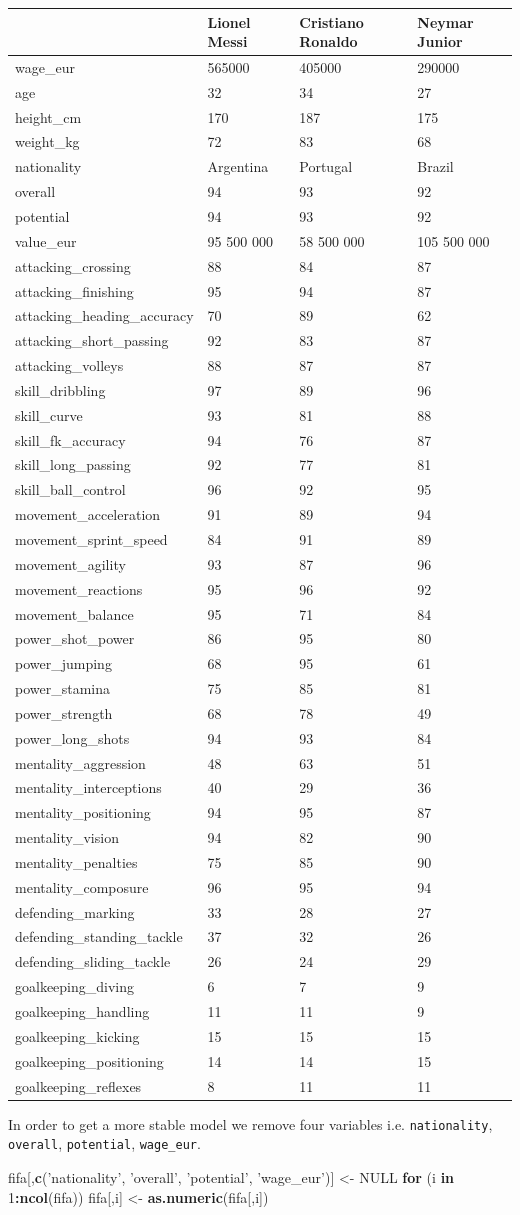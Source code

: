 \documentclass[]{scrbook}
\newenvironment{Shaded}{\begin{snugshade}}{\end{snugshade}}
\newcommand{\ControlFlowTok}[1]{\textcolor[rgb]{0.13,0.29,0.53}{\textbf{#1}}}
\newcommand{\DecValTok}[1]{\textcolor[rgb]{0.00,0.00,0.81}{#1}}
\newcommand{\KeywordTok}[1]{\textcolor[rgb]{0.13,0.29,0.53}{\textbf{#1}}}
\newcommand{\NormalTok}[1]{#1}
\newcommand{\OperatorTok}[1]{\textcolor[rgb]{0.81,0.36,0.00}{\textbf{#1}}}
\newcommand{\OtherTok}[1]{\textcolor[rgb]{0.56,0.35,0.01}{#1}}
\newcommand{\StringTok}[1]{\textcolor[rgb]{0.31,0.60,0.02}{#1}}
\renewenvironment{Shaded} {\begin{snugshade}\small} {\end{snugshade}}
\begin{document}
\begin{longtable}[]{@{}llll@{}}
\toprule
& Lionel Messi & Cristiano Ronaldo & Neymar Junior\tabularnewline
\midrule
\endhead
wage\_eur & 565000 & 405000 & 290000\tabularnewline
age & 32 & 34 & 27\tabularnewline
height\_cm & 170 & 187 & 175\tabularnewline
weight\_kg & 72 & 83 & 68\tabularnewline
nationality & Argentina & Portugal & Brazil\tabularnewline
overall & 94 & 93 & 92\tabularnewline
potential & 94 & 93 & 92\tabularnewline
value\_eur & 95 500 000 & 58 500 000 & 105 500 000\tabularnewline
attacking\_crossing & 88 & 84 & 87\tabularnewline
attacking\_finishing & 95 & 94 & 87\tabularnewline
attacking\_heading\_accuracy & 70 & 89 & 62\tabularnewline
attacking\_short\_passing & 92 & 83 & 87\tabularnewline
attacking\_volleys & 88 & 87 & 87\tabularnewline
skill\_dribbling & 97 & 89 & 96\tabularnewline
skill\_curve & 93 & 81 & 88\tabularnewline
skill\_fk\_accuracy & 94 & 76 & 87\tabularnewline
skill\_long\_passing & 92 & 77 & 81\tabularnewline
skill\_ball\_control & 96 & 92 & 95\tabularnewline
movement\_acceleration & 91 & 89 & 94\tabularnewline
movement\_sprint\_speed & 84 & 91 & 89\tabularnewline
movement\_agility & 93 & 87 & 96\tabularnewline
movement\_reactions & 95 & 96 & 92\tabularnewline
movement\_balance & 95 & 71 & 84\tabularnewline
power\_shot\_power & 86 & 95 & 80\tabularnewline
power\_jumping & 68 & 95 & 61\tabularnewline
power\_stamina & 75 & 85 & 81\tabularnewline
power\_strength & 68 & 78 & 49\tabularnewline
power\_long\_shots & 94 & 93 & 84\tabularnewline
mentality\_aggression & 48 & 63 & 51\tabularnewline
mentality\_interceptions & 40 & 29 & 36\tabularnewline
mentality\_positioning & 94 & 95 & 87\tabularnewline
mentality\_vision & 94 & 82 & 90\tabularnewline
mentality\_penalties & 75 & 85 & 90\tabularnewline
mentality\_composure & 96 & 95 & 94\tabularnewline
defending\_marking & 33 & 28 & 27\tabularnewline
defending\_standing\_tackle & 37 & 32 & 26\tabularnewline
defending\_sliding\_tackle & 26 & 24 & 29\tabularnewline
goalkeeping\_diving & 6 & 7 & 9\tabularnewline
goalkeeping\_handling & 11 & 11 & 9\tabularnewline
goalkeeping\_kicking & 15 & 15 & 15\tabularnewline
goalkeeping\_positioning & 14 & 14 & 15\tabularnewline
goalkeeping\_reflexes & 8 & 11 & 11\tabularnewline
\bottomrule
\end{longtable}

In order to get a more stable model we remove four variables i.e. \texttt{nationality}, \texttt{overall}, \texttt{potential}, \texttt{wage\_eur}.

\begin{Shaded}
\begin{Highlighting}[]
\NormalTok{fifa[,}\KeywordTok{c}\NormalTok{(}\StringTok{'nationality'}\NormalTok{, }\StringTok{'overall'}\NormalTok{, }\StringTok{'potential'}\NormalTok{, }\StringTok{'wage_eur'}\NormalTok{)] <-}\StringTok{ }\OtherTok{NULL}
\ControlFlowTok{for}\NormalTok{ (i }\ControlFlowTok{in} \DecValTok{1}\OperatorTok{:}\KeywordTok{ncol}\NormalTok{(fifa))           fifa[,i] <-}\StringTok{ }\KeywordTok{as.numeric}\NormalTok{(fifa[,i])}
\end{Highlighting}
\end{Shaded}
\end{document}

